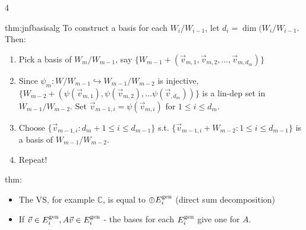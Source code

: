 \documentclass[landscape, 8pt]{extarticle}
\begin{document}
\begin{multicols*}{4}
		
		\begin{thm}{thm:jnfbasisalg}{ }
			To construct a basis for each $W_i/W_{i-1}$, let $d_i = \dim(W_i/W_{i-1}$. Then:\\
			\begin{enumerate}[label=(\arabic*),labelindent=-1ex]
				\item Pick a basis of $W_m/W_{m-1}$, say $\{W_{m-1} + (\vec{v}_{m, 1}, \vec{v}_{m, 2}, \dots, \vec{v}_{m, d_m})\}$\\
				\item Since $\psi_m: W/W_{m-1} \hookrightarrow W_{m-1}/W_{m-2}$ is injective, $\{W_{m-2} + (\psi(\vec{v}_{m, 1}), \psi(\vec{v}_{m, 2}), \dots \psi(\vec{v}_{ , d_m}))\}$ is a lin-dep set in $W_{m-1}/W_{m-2}$. Set $\vec{v}_{m-1, i} = \psi(\vec{v}_{m, i})$ for $1 \le i \le d_m$.\\
				\item Choose $\{\vec{v}_{m-1, i} : d_m + 1 \le i \le d_{m-1}\}$ s.t. $\{\vec{v}_{m-1, i} + W_{m-2} : 1 \le i \le d_{m-1}\}$ is a basis of $W_{m-1}/W_{m-2}$.\\
				\item Repeat!
			\end{enumerate}
			
		\end{thm}
		
		
		\begin{thm}{thm:}{ }
			\begin{itemize}
				\item The VS, for example $\mathbb{C}$, is equal to $\oplus E_i^{\operatorname{gen}}$ (direct sum decomposition)
				\item If $\vec{v}\in E_i^{\operatorname{gen}}, A \vec{v}\in E_i^{\operatorname{gen}}$ - the bases for each $E_i^{\operatorname{gen}}$ give one for $A$.
			\end{itemize}
		
		\end{thm}
		
		
		
		
		
		
		
	\end{multicols*}
	
	
\end{document}
